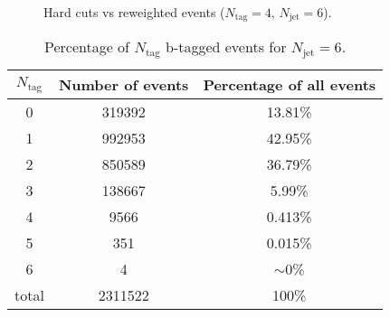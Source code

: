 \documentclass[12pt,a4paper]{article}
\makeatletter
\newcommand{\mcell}[2][c]{
	\begin{tabular}[#1]{@{}c@{}}#2\end{tabular}
}
\makeatother
\begin{document}
\begin{figure}[H]

\caption{Hard cuts vs reweighted events ($N_{\text{tag}}=4,\,N_{\text{jet}}=6$).}
\label{fig:jet_vars}
\end{figure}
\begin{table}[H]
	\begin{center}
		\begin{tabular}{ c | c | c }
			\hline
			$N_{\text{tag}}$ & Number of events & Percentage of all events \\ \hline
			0 & 319392 & 13.81\% \\
			1 & 992953 & 42.95\% \\
			2 & 850589 & 36.79\% \\
			3 & 138667 & 5.99\% \\
			4 & 9566 & 0.413\% \\
			5 & 351 & 0.015\% \\
			6 & 4 & $\sim$0\% \\ \hline
			total & 2311522 & 100\%
		\end{tabular}
	\end{center}
	\caption{Percentage of $N_{\text{tag}}$ b-tagged events for $N_{\text{jet}}=6$.}
	\label{tab:percentage}
\end{table}

\printbibliography
\end{document}
